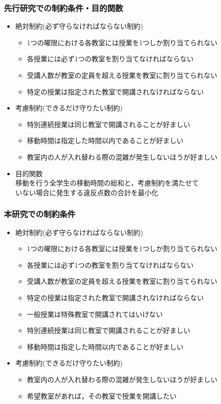 \documentclass[dvipdfmx,12pt]{beamer}
\begin{document}
\begin{frame}\frametitle{先行研究での制約条件・目的関数}
\begin{itemize}
\item 絶対制約(必ず守らなければならない制約)
\begin{itemize}
\item 1つの曜限における各教室には授業を1つしか割り当てられない
\item 各授業には必ず1つの教室を割り当てなければならない
\item 受講人数が教室の定員を超える授業を教室に割り当てられない
\item 特定の授業は指定された教室で開講されなければならない
\end{itemize}


\item 考慮制約(できるだけ守りたい制約)

\begin{itemize}
\item 特別連続授業は同じ教室で開講されることが好ましい
\item 移動時間は指定した時間以内であることが好ましい
\item 教室内の人が入れ替わる際の混雑が発生しないほうが好ましい
\end{itemize}
\item 目的関数\\
移動を行う全学生の移動時間の総和と，考慮制約を満たせて\\いない場合に発生する違反点数の合計を最小化
\end{itemize}
\end{frame}


\begin{frame}\frametitle{本研究での制約条件}
\begin{itemize}
\item 絶対制約(必ず守らなければならない制約)
\begin{itemize}
\item 1つの曜限における各教室には授業を1つしか割り当てられない
\item 各授業には必ず1つの教室を割り当てなければならない
\item 受講人数が教室の定員を超える授業を教室に割り当てられない
\item 特定の授業は指定された教室で開講されなければならない
\item 一般授業は特殊教室で開講されてはいけない
\item 特別連続授業は同じ教室で開講されることが好ましい
\item 移動時間は指定した時間以内であることが好ましい
\end{itemize}


\item 考慮制約(できるだけ守りたい制約)

\begin{itemize}
\item 教室内の人が入れ替わる際の混雑が発生しないほうが好ましい
\item 希望教室があれば，その教室で授業を開講したい
\end{itemize}
\end{itemize}
\end{frame}
\end{document}
